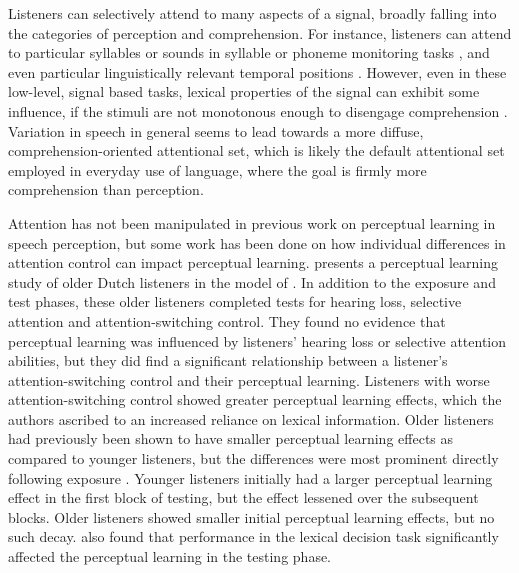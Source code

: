 Listeners can selectively attend to many aspects of a signal, broadly falling into the categories of perception and comprehension.
For instance, listeners can attend to particular syllables or sounds in syllable or phoneme monitoring tasks \citep[and others]{Norris1988}, and even particular linguistically relevant temporal positions \citep{Pitt1990}.
However, even in these low-level, signal based tasks, lexical properties of the signal can exhibit some influence, if the stimuli are not monotonous enough to disengage comprehension \citep{Cutler1987}.  
Variation in speech in general seems to lead towards a more diffuse, comprehension-oriented attentional set, which is likely the default attentional set employed in everyday use of language, where the goal is firmly more comprehension than perception.

Attention has not been manipulated in previous work on perceptual learning in speech perception, but some work has been done on how individual differences in attention control can impact perceptual learning.
\citet{Scharenborg2014} presents a perceptual learning study of older Dutch listeners in the model of \citet{Norris2003}.  
In addition to the exposure and test phases, these older listeners completed tests for hearing loss, selective attention and attention-switching control.  
They found no evidence that perceptual learning was influenced by listeners' hearing loss or selective attention abilities, but they did find a significant relationship between a listener's attention-switching control and their perceptual learning.  
Listeners with worse attention-switching control showed greater perceptual learning effects, which the authors ascribed to an increased reliance on lexical information.  
Older listeners had previously been shown to have smaller perceptual learning effects as compared to younger listeners, but the differences were most prominent directly following exposure \citep{Scharenborg2013}.  
Younger listeners initially had a larger perceptual learning effect in the first block of testing, but the effect lessened over the subsequent blocks.  
Older listeners showed smaller initial perceptual learning effects, but no such decay.  
\citet{Scharenborg2013} also found that performance in the lexical decision task significantly affected the perceptual learning in the testing phase.

